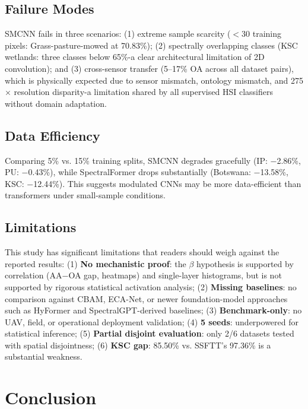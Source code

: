 \documentclass[conference]{IEEEtran}
\begin{document}
\subsection{Failure Modes}
\label{sec:failure}

SMCNN fails in three scenarios: (1) extreme sample scarcity ($<$30 training pixels: Grass-pasture-mowed at 70.83\%); (2) spectrally overlapping classes (KSC wetlands: three classes below 65\%-a clear architectural limitation of 2D convolution); and (3) cross-sensor transfer (5--17\% OA across all dataset pairs), which is physically expected due to sensor mismatch, ontology mismatch, and 275$\times$ resolution disparity-a limitation shared by all supervised HSI classifiers without domain adaptation.

\subsection{Data Efficiency}

Comparing 5\% vs. 15\% training splits, SMCNN degrades gracefully (IP: $-$2.86\%, PU: $-$0.43\%), while SpectralFormer drops substantially (Botswana: $-$13.58\%, KSC: $-$12.44\%). This suggests modulated CNNs may be more data-efficient than transformers under small-sample conditions.

\subsection{Limitations}
\label{sec:limitations}

This study has significant limitations that readers should weigh against the reported results: (1) \textbf{No mechanistic proof}: the $\beta$ hypothesis is supported by correlation (AA$-$OA gap, heatmaps) and single-layer histograms, but is not supported by rigorous statistical activation analysis; (2) \textbf{Missing baselines}: no comparison against CBAM, ECA-Net, or newer foundation-model approaches such as HyFormer and SpectralGPT-derived baselines; (3) \textbf{Benchmark-only}: no UAV, field, or operational deployment validation; (4) \textbf{5 seeds}: underpowered for statistical inference; (5) \textbf{Partial disjoint evaluation}: only 2/6 datasets tested with spatial disjointness; (6) \textbf{KSC gap}: 85.50\% vs. SSFTT's 97.36\% is a substantial weakness.

\section{Conclusion}
\end{document}
